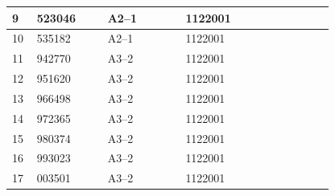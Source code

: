 \documentclass[UTF8,10pt,a4paper,fontset=fandol]{ctexart}
\newcommand{\fieldvalue}[1]{#1}
\begin{document}
\begin{tabular}{|p{0.07\linewidth}|p{0.20\linewidth}|p{0.22\linewidth}|p{0.24\linewidth}|p{0.18\linewidth}|}
\hline
9 &
\fieldvalue{523046} &
\fieldvalue{A2--1} &
\fieldvalue{1122001} & \\
\hline
10 &
\fieldvalue{535182} &
\fieldvalue{A2--1} &
\fieldvalue{1122001} & \\
\hline
11 &
\fieldvalue{942770} &
\fieldvalue{A3--2} &
\fieldvalue{1122001} & \\
\hline
12 &
\fieldvalue{951620} &
\fieldvalue{A3--2} &
\fieldvalue{1122001} & \\
\hline
13 &
\fieldvalue{966498} &
\fieldvalue{A3--2} &
\fieldvalue{1122001} & \\
\hline
14 &
\fieldvalue{972365} &
\fieldvalue{A3--2} &
\fieldvalue{1122001} & \\
\hline
15 &
\fieldvalue{980374} &
\fieldvalue{A3--2} &
\fieldvalue{1122001} & \\
\hline
16 &
\fieldvalue{993023} &
\fieldvalue{A3--2} &
\fieldvalue{1122001} & \\
\hline
17 &
\fieldvalue{003501} &
\fieldvalue{A3--2} &
\fieldvalue{1122001} & \\

\end{tabular}
\end{document}
